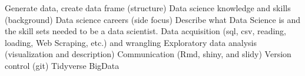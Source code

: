 \begin{outline}
	\1 Generate data, create data frame (structure)
	\1 Data science knowledge and skills (background)
	\1 Data science careers  (side focus)
	\1 Describe what Data Science is and the skill sets needed to be a data scientist.
	\1 Data acquisition (sql, csv, reading, loading, Web Scraping, etc.) and wrangling  
	\1 Exploratory data analysis (visualization and description)  
	\1 Communication (Rmd, shiny, and slidy)
	\1 Version control (git)
	\1 Tidyverse
	\1 BigData
\end{outline}

